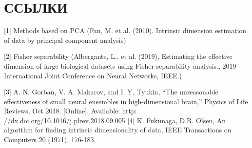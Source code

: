\documentclass[english, russian]{sobraep}
\begin{document}
\section{ССЫЛКИ}
[1] Methods based on PCA (Fan, M. et al. (2010). Intrinsic dimension estimation of data by principal component analysis)

[2] Fisher separability (Albergante, L., et al. (2019), Estimating the effective dimension of large biological datasets using Fisher separability analysis., 2019 International Joint Conference on Neural Networks, IEEE.)

[3] A. N. Gorban, V. A. Makarov, and I. Y. Tyukin, “The unreasonable
effectiveness of small neural ensembles in high-dimensional brain,”
Physics of Life Reviews, Oct 2018. [Online]. Available: http:
//dx.doi.org/10.1016/j.plrev.2018.09.005
[4] K. Fukunaga, D.R. Olsen, An algorithm for finding intrinsic
dimensionality of data, IEEE Transactions on Computers 20
(1971), 176-183.
\end{document}
